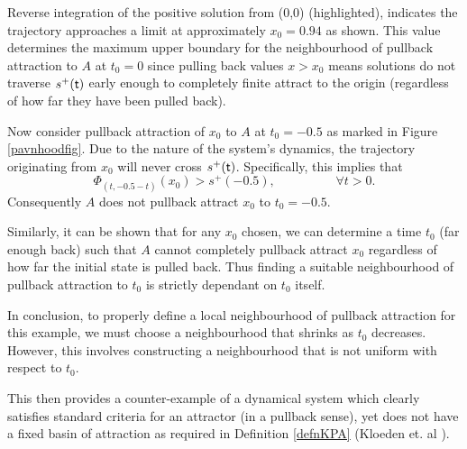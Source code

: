 \begin{example}
Reverse integration of the positive solution from (0,0) (highlighted),
indicates the trajectory approaches a limit at approximately $x_0 = 0.94$ as
shown. This value determines the maximum upper
boundary for the neighbourhood of pullback attraction to $A$ at $t_0 = 0$ since pulling back values $x > x_0$ means solutions do not traverse $s^+( \mathsf{\mathsf{t}})$ early enough to completely finite attract to the origin (regardless of how far they have been pulled back).

Now consider pullback attraction of $x_0$ to $A$
at $t_0 = -0.5$ as marked in Figure \ref{pavnhoodfig}.  Due to the nature
of the system's dynamics, the trajectory originating from $x_0$ will never cross $s^+( \mathsf{\mathsf{t}})$. Specifically, this implies that
\[ \Phi_{(t, -0.5-t)}(x_0) > s^+(-0.5), \hspace{2cm} \forall t > 0. \]
Consequently $A$ does not pullback attract $x_0$ to $t_0 = -0.5$.

Similarly, it can be shown that for any $x_0$ chosen, we can determine a time $t_0$ (far enough back)
such that $A$ cannot completely pullback attract $x_0$ regardless of how far the initial state 
is pulled back. Thus finding a suitable neighbourhood of pullback attraction to $t_0$ is strictly dependant on 
$t_0$ itself. 

In conclusion, to properly define a local neighbourhood of
pullback attraction for this example, we must choose a neighbourhood that
shrinks as $t_0$ decreases. However, this involves constructing a neighbourhood
that is not uniform with respect to $t_0$.

This then provides a counter-example of a dynamical system which clearly satisfies standard criteria for an attractor 
(in a pullback sense), yet does not have a fixed basin of attraction as required in Definition \ref{defnKPA} (Kloeden et. al ).

\end{example}


